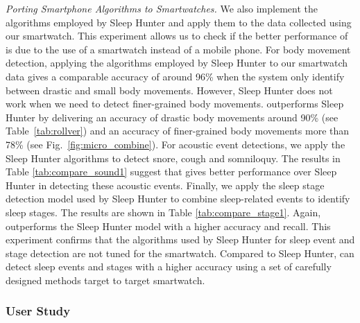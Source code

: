 \vspace{2mm} \noindent \emph{Porting Smartphone Algorithms to Smartwatches.} We also implement the algorithms employed by Sleep Hunter and
apply them to the data collected using our smartwatch. This experiment allows us to check if the better performance of {\systemname} is due
to the use of a smartwatch instead of a mobile phone. For body movement detection, applying the algorithms employed by Sleep Hunter to our
smartwatch data gives a comparable accuracy of around 96\% when the system only identify between drastic and small body movements. However,
Sleep Hunter does not work when we need to detect finer-grained body movements.  {\systemname} outperforms Sleep Hunter by delivering an
accuracy of drastic body movements around 90\% (see Table~\ref{tab:rollver}) and an accuracy of finer-grained body movements more than 78\%
(see Fig.~\ref{fig:micro_combine}). For acoustic event detections, we apply the Sleep Hunter algorithms to detect snore, cough and
somniloquy. The results in Table \ref{tab:compare_sound1} suggest that {\systemname} gives better performance over Sleep Hunter in
detecting these acoustic events. Finally, we apply the sleep stage detection model used by Sleep Hunter to combine sleep-related events to
identify sleep stages. The results are shown in Table \ref{tab:compare_stage1}. Again,  {\systemname} outperforms the Sleep Hunter model
with a higher accuracy and recall. This experiment confirms that the algorithms used by Sleep Hunter for sleep event and stage detection
are not tuned for the smartwatch. Compared to Sleep Hunter, {\systemname} can detect sleep events and stages with a higher accuracy using a
set of carefully designed methods target to target smartwatch.


\subsubsection{User Study}\label{sec:user_survey}

